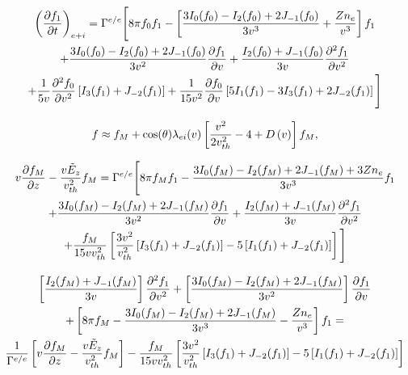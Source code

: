 \begin{multline}
  \left(\frac{\partial{f_1}}{\partial{t}}\right)_{e+i} = \Gamma^{e/e}\Bigg[
  8\pi f_0 f_1  
  - \left[\frac{3 I_0(f_0) - I_2(f_0) + 2 J_{-1}(f_0)}{3v^3} +
  \frac{Z n_e}{v^3}\right] f_1
  \\
  +   \frac{3 I_0(f_0) -I_2(f_0) + 2 J_{-1}(f_0)}{3v^2}
  \frac{\partial{f_1}}{\partial{v}}
  + \frac{I_2(f_0) + J_{-1}(f_0)}{3v}
  \frac{\partial^2 f_1}{\partial v^2} 
  \\
  + \frac{1}{5 v} \frac{\partial^2 f_0}{\partial v^2}
  \left[I_{3}(f_1) + J_{-2}(f_1)\right]
  + \frac{1}{15 v^2} \frac{\partial{f_0}}{\partial{v}}
  \left[5 I_1(f_1) - 3 I_{3}(f_1) + 2 J_{-2}(f_1) 
  \right] \Bigg]
\end{multline}

\begin{equation}
  f \approx f_M + \cos(\theta) \lambda_{ei}(v) 
  \left[\frac{v^2}{2v_{th}^2} - 4 + D\left(v\right) \right] f_M ,
  \nonumber
\end{equation}

\begin{multline}
  v\frac{\partial{f_M}}{\partial{z}} - \frac{v\tilde{E}_z}{v_{th}^2}f_M = \Gamma^{e/e}\Bigg[
  8\pi f_M f_1  
  - \frac{3 I_0(f_M) - I_2(f_M) + 2 J_{-1}(f_M) + 3 Z n_e}{3v^3} f_1
  \\
  +   \frac{3 I_0(f_M) -I_2(f_M) + 2 J_{-1}(f_M)}{3v^2}
  \frac{\partial{f_1}}{\partial{v}}
  + \frac{I_2(f_M) + J_{-1}(f_M)}{3v}
  \frac{\partial^2 f_1}{\partial v^2} 
  \\
  + \frac{f_M}{15 vv_{th}^2} \left[\frac{3v^2}{v_{th}^2}
  \left[I_{3}(f_1) + J_{-2}(f_1)\right]
  - 5 \left[I_1(f_1) + J_{-2}(f_1)\right]
  \right] \Bigg]
  \nonumber
\end{multline}

\begin{multline} 
  \left[\frac{I_2(f_M) + J_{-1}(f_M)}{3v}\right]
  \frac{\partial^2 f_1}{\partial v^2}
  + \left[\frac{3 I_0(f_M) -I_2(f_M) + 2 J_{-1}(f_M)}{3v^2}\right]
  \frac{\partial{f_1}}{\partial{v}}
  \\ 
  + \left[8\pi f_M  - \frac{3 I_0(f_M) - I_2(f_M) + 2 J_{-1}(f_M)}{3v^3}
  - \frac{Z n_e}{v^3} \right] f_1 =
  \\
  \frac{1}{\Gamma^{e/e}}
  \left[v\frac{\partial{f_M}}{\partial{z}} - \frac{v\tilde{E}_z}{v_{th}^2}f_M\right]
  - \frac{f_M}{15 vv_{th}^2} \left[\frac{3v^2}{v_{th}^2}
  \left[I_{3}(f_1) + J_{-2}(f_1)\right]
  - 5 \left[I_1(f_1) + J_{-2}(f_1)\right]
  \right]
  \label{eq:FP_f1_diffusive}
\end{multline}

